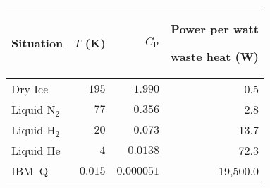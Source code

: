 \documentclass[10pt]{article}
\begin{document}
\thispagestyle{empty}
\setlength\dashlinedash{1pt}
\setlength\dashlinegap{2pt}
\newcommand{\CPf}{C_\mathrm{P}}

\renewcommand*{\arraystretch}{1.2}\small
\begin{tabular}{l:r:r:r}\toprule
Situation
	& $T$ (K)
		& $\CPf$ & \parbox[b]{.75in}{\raggedleft Power per watt\par waste heat (W)} \\
\hline
Dry Ice
	& $195$
		& $1.990$
			& 0.5 \\ \hdashline
Liquid N$_2$
	& $77$
		& $0.356$
			& 2.8 \\ \hdashline
Liquid H$_2$
	& $20$
		& $0.073$
			& 13.7 \\ \hdashline
Liquid He
	& $4$
		& $0.0138$
			& 72.3 \\ \hdashline
IBM~Q	& $0.015$
		& $0.000051$
			& 19,500.0 \\
\bottomrule
\end{tabular}
\end{document}

